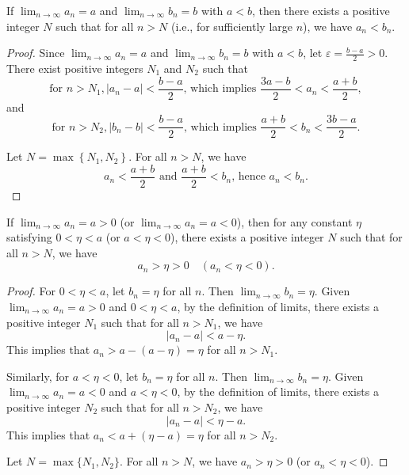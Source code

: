 %
\begin{theorem}
If $\lim_{n \to \infty} a_n = a$ and $\lim_{n \to \infty} b_n = b$ with $a < b$, then there exists a positive integer $N$ such that for all $n > N$ (i.e., for sufficiently large $n$), we have $a_n < b_n$.
\end{theorem}
\begin{proof}
Since $\lim_{n \to \infty} a_n = a$ and $\lim_{n \to \infty} b_n = b$ with $a < b$, let $\varepsilon = \frac{b - a}{2} > 0$. There exist positive integers $N_1$ and $N_2$ such that
\[
\text{for } n > N_1, \left|a_n - a\right| < \frac{b - a}{2} \text{, which implies } \frac{3a - b}{2} < a_n < \frac{a + b}{2},
\]
and
\[
\text{for } n > N_2, \left|b_n - b\right| < \frac{b - a}{2} \text{, which implies } \frac{a + b}{2} < b_n < \frac{3b - a}{2}.
\]

Let $N = \max \left\{N_1, N_2\right\}$. For all $n > N$, we have
\[
a_n < \frac{a + b}{2} \text{ and } \frac{a + b}{2} < b_n \text{, hence } a_n < b_n.
\]
\end{proof}

\begin{corollary}
If $\lim_{n \to \infty} a_n = a > 0$ (or $\lim_{n \to \infty} a_n = a < 0$), then for any constant $\eta$ satisfying $0 < \eta < a$ (or $a < \eta < 0$), there exists a positive integer $N$ such that for all $n > N$, we have
\[
a_n > \eta > 0 \quad \left(a_n < \eta < 0\right).
\]
\end{corollary}
\begin{proof}
For $0 < \eta < a$, let $b_n = \eta$ for all $n$. Then $\lim_{n \to \infty} b_n = \eta$. Given $\lim_{n \to \infty} a_n = a > 0$ and $0 < \eta < a$, by the definition of limits, there exists a positive integer $N_1$ such that for all $n > N_1$, we have
\[
|a_n - a| < a - \eta.
\]
This implies that $a_n > a - (a - \eta) = \eta$ for all $n > N_1$.

Similarly, for $a < \eta < 0$, let $b_n = \eta$ for all $n$. Then $\lim_{n \to \infty} b_n = \eta$. Given $\lim_{n \to \infty} a_n = a < 0$ and $a < \eta < 0$, by the definition of limits, there exists a positive integer $N_2$ such that for all $n > N_2$, we have
\[
|a_n - a| < \eta - a.
\]
This implies that $a_n < a + (\eta - a) = \eta$ for all $n > N_2$.

Let $N = \max\{N_1, N_2\}$. For all $n > N$, we have $a_n > \eta > 0$ (or $a_n < \eta < 0$).
\end{proof}


